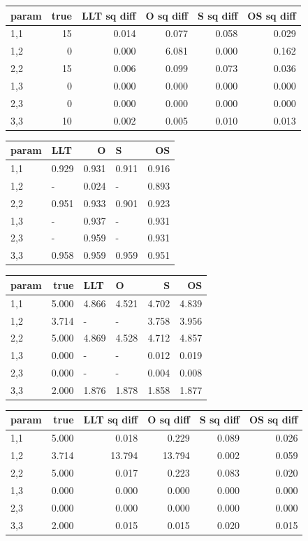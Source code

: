 \documentclass[
]{article}
\begin{document}
\begin{longtable}[t]{l|r|r|r|r|r}
\hline
param & true & LLT sq diff & O sq diff & S sq diff & OS sq diff\\
\hline
1,1 & 15 & 0.014 & 0.077 & 0.058 & 0.029\\
\hline
1,2 & 0 & 0.000 & 6.081 & 0.000 & 0.162\\
\hline
2,2 & 15 & 0.006 & 0.099 & 0.073 & 0.036\\
\hline
1,3 & 0 & 0.000 & 0.000 & 0.000 & 0.000\\
\hline
2,3 & 0 & 0.000 & 0.000 & 0.000 & 0.000\\
\hline
3,3 & 10 & 0.002 & 0.005 & 0.010 & 0.013\\
\hline
\end{longtable}

\begin{longtable}[t]{l|l|r|l|r}
\hline
param & LLT & O & S & OS\\
\hline
1,1 & 0.929 & 0.931 & 0.911 & 0.916\\
\hline
1,2 & - & 0.024 & - & 0.893\\
\hline
2,2 & 0.951 & 0.933 & 0.901 & 0.923\\
\hline
1,3 & - & 0.937 & - & 0.931\\
\hline
2,3 & - & 0.959 & - & 0.931\\
\hline
3,3 & 0.958 & 0.959 & 0.959 & 0.951\\
\hline
\end{longtable}

\begin{longtable}[t]{l|r|l|l|r|r}
\hline
param & true & LLT & O & S & OS\\
\hline
1,1 & 5.000 & 4.866 & 4.521 & 4.702 & 4.839\\
\hline
1,2 & 3.714 & - & - & 3.758 & 3.956\\
\hline
2,2 & 5.000 & 4.869 & 4.528 & 4.712 & 4.857\\
\hline
1,3 & 0.000 & - & - & 0.012 & 0.019\\
\hline
2,3 & 0.000 & - & - & 0.004 & 0.008\\
\hline
3,3 & 2.000 & 1.876 & 1.878 & 1.858 & 1.877\\
\hline
\end{longtable}

\begin{longtable}[t]{l|r|r|r|r|r}
\hline
param & true & LLT sq diff & O sq diff & S sq diff & OS sq diff\\
\hline
1,1 & 5.000 & 0.018 & 0.229 & 0.089 & 0.026\\
\hline
1,2 & 3.714 & 13.794 & 13.794 & 0.002 & 0.059\\
\hline
2,2 & 5.000 & 0.017 & 0.223 & 0.083 & 0.020\\
\hline
1,3 & 0.000 & 0.000 & 0.000 & 0.000 & 0.000\\
\hline
2,3 & 0.000 & 0.000 & 0.000 & 0.000 & 0.000\\
\hline
3,3 & 2.000 & 0.015 & 0.015 & 0.020 & 0.015\\
\hline
\end{longtable}
\end{document}
